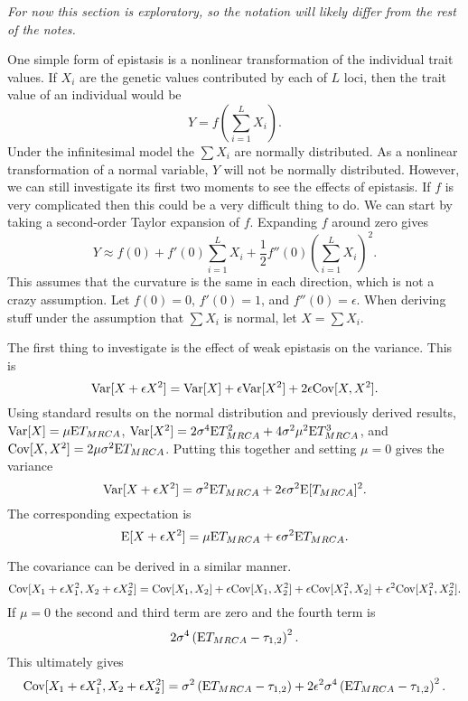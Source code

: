 \textit{For now this section is exploratory, so the notation will likely differ
  from the rest of the notes.}

One simple form of epistasis is a nonlinear transformation of the individual
trait values. If $X_i$ are the genetic values contributed by each of $L$ loci,
then the trait value of an individual would be
\begin{equation*}
  Y = f\left(\sum_{i=1}^{L} X_i\right).
\end{equation*}
Under the infinitesimal model the $\sum X_i$ are normally distributed. As a
nonlinear transformation of a normal variable, $Y$ will not be normally
distributed. However, we can still investigate its first two moments to see the
effects of epistasis. If $f$ is very complicated then this could be a very
difficult thing to do. We can start by taking a second-order Taylor expansion of
$f$. Expanding $f$ around zero gives
\begin{equation*}
  Y \approx f(0) + f'(0)\sum_{i=1}^L X_i + \frac{1}{2}f''(0)\left(\sum_{i=1}^L X_i\right)^2.
\end{equation*}
This assumes that the curvature is the same in each direction, which is not a
crazy assumption. Let $f(0)=0$, $f'(0)=1$, and $f''(0)=\epsilon$. When deriving
stuff under the assumption that $\sum X_i$ is normal, let $X=\sum X_i$.

The first thing to investigate is the effect of weak epistasis on the variance.
This is
\begin{equation*}
  \mathrm{Var}[X + \epsilon X^2] = \mathrm{Var}[X] + \epsilon \mathrm{Var}[X^2] + 2 \epsilon \mathrm{Cov}[X,X^2].  
\end{equation*}
Using standard results on the normal distribution and previously derived
results, $\mathrm{Var}[X]=\mu \mathrm{E} T_{MRCA}$, $\mathrm{Var}[X^2]=2\sigma^4\mathrm{E} T_{MRCA}^2+4\sigma^2\mu^2 \mathrm{E} T_{MRCA}^3$,
and $\mathrm{Cov}[X,X^2]=2\mu\sigma^2 \mathrm{E} T_{MRCA}$. Putting this together and setting $\mu=0$ gives the
variance
\begin{equation}
  \mathrm{Var}[X + \epsilon X^2] = \sigma^2\mathrm{E} T_{MRCA} + 2\epsilon \sigma^2 \mathrm{E} [T_{MRCA}]^2.
\end{equation}
The corresponding expectation is
\begin{equation}
  \mathrm{E}[X + \epsilon X^2] = \mu \mathrm{E} T_{MRCA} + \epsilon \sigma^2 \mathrm{E} T_{MRCA}.
\end{equation}

The covariance can be derived in a similar manner.
\begin{equation}
  \mathrm{Cov}[X_1 + \epsilon X_1^2,X_2 + \epsilon X_2^2] = \mathrm{Cov}[X_1,X_2] + \epsilon
  \mathrm{Cov}[X_1,X_2^2] + \epsilon \mathrm{Cov}[X_1^2,X_2] + \epsilon^2 \mathrm{Cov}[X_1^2,X_2^2].
\end{equation}
If $\mu=0$ the second and third term are zero and the fourth term is
\begin{equation*}
  2\sigma^4\left( \mathrm{E} T_{MRCA} - \tau_{1,2} \right)^2.
\end{equation*}
This ultimately gives
\begin{equation}
  \mathrm{Cov}[X_1 + \epsilon X_1^2,X_2 + \epsilon X_2^2] = \sigma^2\left(\mathrm{E} T_{MRCA} -
  \tau_{1,2}\right) + 2\epsilon^2 \sigma^4\left(\mathrm{E} T_{MRCA} -
  \tau_{1,2}\right)^2.
\end{equation}

